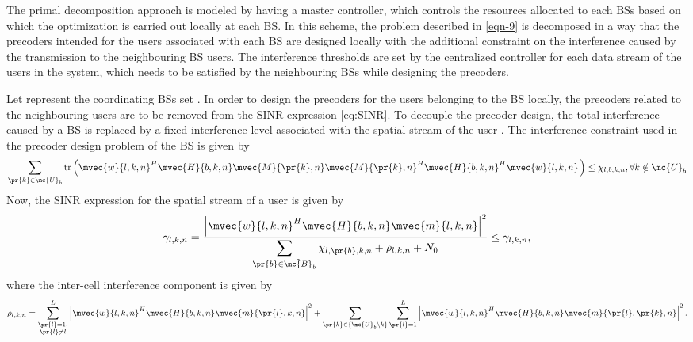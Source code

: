The primal decomposition approach is modeled by having a master controller, which controls the resources allocated to each \acp{BS} based on which the optimization is carried out locally at each \ac{BS}. In this scheme, the problem described in \eqref{eqn-9} is decomposed in a way that the precoders intended for the users associated with each \ac{BS} are designed locally with the additional constraint on the interference caused by the transmission to the neighbouring \ac{BS} users. The interference thresholds are set by the centralized controller for each data stream of the users in the system, which needs to be satisfied by the neighbouring \acp{BS} while designing the precoders.

Let  represent the coordinating \acp{BS} set . In order to design the precoders for the users  belonging to the \ac{BS}  locally, the precoders related to the neighbouring users  are to be removed from the \ac{SINR} expression \eqref{eq:SINR}. To decouple the precoder design, the total interference caused by a \ac{BS}  is replaced by a fixed interference level  associated with the  spatial stream of the user . The interference constraint used in the precoder design problem of the \ac{BS}  is given by
\begin{equation}
\sum_{\pr{k} \in \mc{U}_b} \text{tr} \left ( \mvec{w}{l,k,n}^H \mvec{H}{b,k,n} \mvec{M}{\pr{k},n} \mvec{M}{\pr{k},n}^H \mvec{H}{b,k,n}^H \mvec{w}{l,k,n} \, \right ) \leq \chi_{l,b,k,n}, \forall k \notin \mc{U}_b
\label{eq-primal-constr}
\end{equation}
Now, the \ac{SINR} expression for the spatial stream  of a user  is given by
\begin{equation}\label{eq:SINR-primal}
\bar{\gamma}_{l,k,n} = \frac{\left | \mvec{w}{l,k,n}^H \mvec{H}{b,k,n} \mvec{m}{l,k,n} \right |^2}{\displaystyle \sum_{\pr{b} \in \tilde{\mc{B}}_{b} } \chi_{l,\pr{b},k,n} + \rho_{l,k,n} + N_0} \leq \gamma_{l,k,n},
\end{equation}
where the inter-cell interference component  is given by
\begin{equation}
\rho_{l,k,n} = \sum_{\substack{\pr{l} = 1 ,\\ \pr{l} \neq l}}^L \left | \mvec{w}{l,k,n}^H \mvec{H}{b,k,n} \mvec{m}{\pr{l},k,n} \right |^2 + \sum_{\pr{k} \in \{\mc{U}_{b} \backslash k \}} \sum_{\pr{l}=1}^L \left | \mvec{w}{l,k,n}^H \mvec{H}{b,k,n} \mvec{m}{\pr{l},\pr{k},n} \right |^2.
\label{eqn-rho}
\end{equation}

